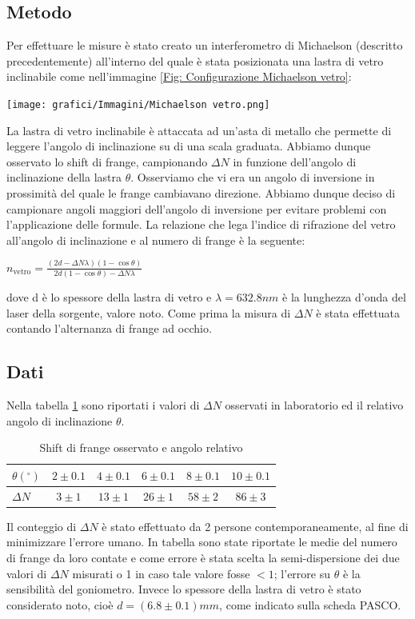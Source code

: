 \documentclass[a4paper]{article}
\begin{document}
\subsection{Metodo}
Per effettuare le misure è stato creato un interferometro di Michaelson (descritto precedentemente) all'interno del quale è stata posizionata una lastra di vetro inclinabile come nell'immagine \ref{Fig: Configurazione Michaelson vetro}:
\begin{center}
	\texttt{[image: grafici/Immagini/Michaelson vetro.png]}
\label{Fig: Configurazione Michaelson vetro}
\end{center}
La lastra di vetro inclinabile è attaccata ad un'asta di metallo che permette di leggere l'angolo di inclinazione su di una scala graduata. Abbiamo dunque osservato lo shift di frange, campionando $\Delta N$ in funzione dell'angolo di inclinazione della lastra $\theta$. Osserviamo che vi era un angolo di inversione in prossimità del quale le frange cambiavano direzione. Abbiamo dunque deciso di campionare angoli maggiori dell'angolo di inversione per evitare problemi con l'applicazione delle formule. La relazione che lega l'indice di rifrazione del vetro all'angolo di inclinazione e al numero di frange è la seguente:
\begin{center}
    $n_{\text{vetro}} = \frac{(2d - \Delta N \lambda)(1 - \cos\theta)}{2d(1 - \cos\theta) - \Delta N \lambda}$
\label{eq:indice rifrazione vetro}
\end{center}
dove d è lo spessore della lastra di vetro e $\lambda=632.8nm$ è la lunghezza d'onda del laser della sorgente, valore noto.
Come prima la misura di $\Delta N$ è stata effettuata contando l'alternanza di frange ad occhio.
\subsection{Dati}
Nella tabella \ref{tab: valori michaelson vetro} sono riportati i valori di $\Delta N$ osservati in laboratorio ed il relativo angolo di inclinazione $\theta$.
\begin{table}[htbp]
\centering
\caption{Shift di frange osservato e angolo relativo}
\begin{tabular}{|l|ccccc|}
\hline
$\theta(^\circ)$ & $2\pm0.1$ & $4\pm0.1$ & $6\pm0.1$ & $8\pm0.1$ & $10\pm0.1$\\\hline\hline
$\Delta N$ & $3 \pm 1$ & $13  \pm 1$ & $26 \pm 1$ & $58 \pm 2$ & $86 \pm 3$ \\\hline
\end{tabular}
\label{tab: valori michaelson vetro}
\end{table} 
Il conteggio di $\Delta N$ è stato effettuato da 2 persone contemporaneamente, al fine di minimizzare l'errore umano. In tabella sono state riportate le medie del numero di frange da loro contate e come errore è stata scelta la semi-dispersione dei due valori di $\Delta N$ misurati o 1 in caso tale valore fosse $<1$; l'errore su $\theta$ è la sensibilità del goniometro. Invece lo spessore della lastra di vetro è stato considerato noto, cioè $d=(6.8 \pm 0.1)mm$, come indicato sulla scheda PASCO.
\end{document}
